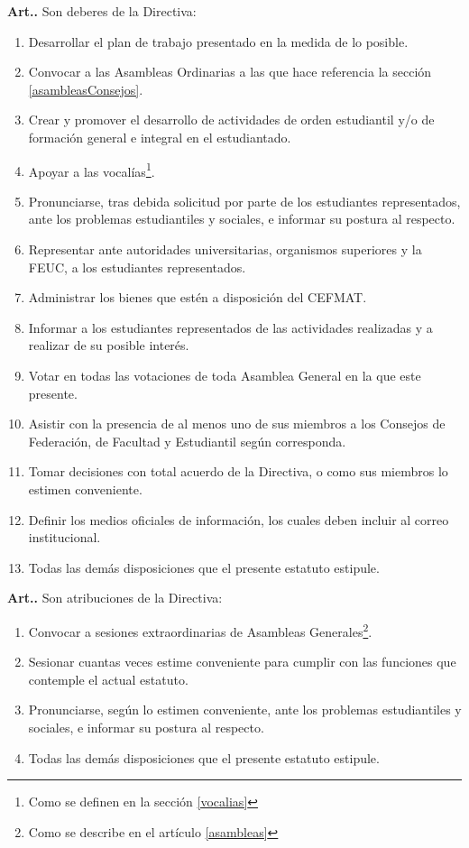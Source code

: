 \documentclass[letterpaper,11pt]{article}
\newcounter{art}
\newenvironment{art}{\refstepcounter{art}\mbox{\textbf{Art.{\space}\theart.}}\ignorespaces}{}
\begin{document}
\begin{art}\label{deberesDirectiva}
    Son deberes de la Directiva:
    \begin{enumerate}
        \item Desarrollar el plan de trabajo presentado en la medida de lo posible.
        \item Convocar a las Asambleas Ordinarias a las que hace referencia la sección \ref{asambleasConsejos}.
        \item Crear y promover el desarrollo de actividades de orden estudiantil y/o de formación general e integral en el estudiantado.
        \item Apoyar a las vocalías\footnote{Como se definen en la sección \ref{vocalias}}.
        \item Pronunciarse, tras debida solicitud por parte de los estudiantes representados, ante los problemas estudiantiles y sociales, e informar su postura al respecto.
        \item Representar ante autoridades universitarias, organismos superiores y la FEUC, a los estudiantes representados.
        \item Administrar los bienes que estén a disposición del CEFMAT.
        \item Informar a los estudiantes representados de las actividades realizadas y a realizar de su posible interés.
        \item Votar en todas las votaciones de toda Asamblea General en la que este presente.
        \item Asistir con la presencia de al menos uno de sus miembros a los Consejos de Federación, de Facultad y Estudiantil según corresponda.
        \item Tomar decisiones con total acuerdo de la Directiva, o como sus miembros lo estimen conveniente.
        \item Definir los medios oficiales de información, los cuales deben incluir al correo institucional.
        \item Todas las demás disposiciones que el presente estatuto estipule.
    \end{enumerate}
\end{art}

\begin{art}\label{atribucionesDirectiva}
    Son atribuciones de la Directiva:
    \begin{enumerate}
        \item Convocar a sesiones extraordinarias de Asambleas Generales\footnote{Como se describe en el artículo \ref{asambleas}}.
        \item Sesionar cuantas veces estime conveniente para cumplir con las funciones que contemple el actual estatuto.
        \item Pronunciarse, según lo estimen conveniente, ante los problemas estudiantiles y sociales, e informar su postura al respecto.
        \item Todas las demás disposiciones que el presente estatuto estipule.
    \end{enumerate}
\end{art}
\end{document}
